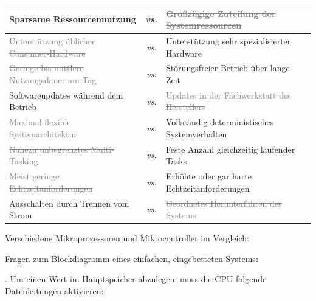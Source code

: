 \begin{longtable}{|p{} c p{}|}
    \hline
    Sparsame Ressourcennutzung
    & \textit{vs.} &
    \textcolor{gray}{\sout{Großzügige Zuteilung der Systemressourcen}}
    \\

    \hline
    \textcolor{gray}{\sout{Unterstützung üblicher Consumer-Hardware}}
    & \textit{vs.} &
    Unterstützung sehr spezialisierter Hardware
    \\

    \hline
    \textcolor{gray}{\sout{Geringe bis mittlere Nutzungsdauer am Tag}}
    & \textit{vs.} &
    Störungsfreier Betrieb über lange Zeit
    \\

    \hline
    Softwareupdates während dem Betrieb
    & \textit{vs.} &
    \textcolor{gray}{\sout{Updates in der Fachwerkstatt des Herstellers}}
    \\

    \hline
    \textcolor{gray}{\sout{Maximal flexible Systemarchitektur}}
    & \textit{vs.} &
    Vollständig deterministisches Systemverhalten
    \\

    \hline
    \textcolor{gray}{\sout{Nahezu unbegrenztes Multi-Tasking}}
    & \textit{vs.} &
    Feste Anzahl gleichzeitig laufender Tasks
    \\

    \hline
    \textcolor{gray}{\sout{Meist geringe Echtzeitanforderungen}}
    & \textit{vs.} &
    Erhöhte oder gar harte Echtzeitanforderungen
    \\

    \hline
    Ausschalten durch Trennen vom Strom
    & \textit{vs.} &
    \textcolor{gray}{\sout{Geordnetes Herunterfahren des Systems}}
    \\

    \hline
\end{longtable}

\teilaufgabe
Verschiedene Mikroprozessoren und Mikrocontroller im Vergleich:

\clearpage

\teilaufgabe
Fragen zum Blockdiagramm eines einfachen, eingebetteten Systems:

. Um einen Wert im Hauptspeicher abzulegen, muss die CPU folgende Datenleitungen
aktivieren:

